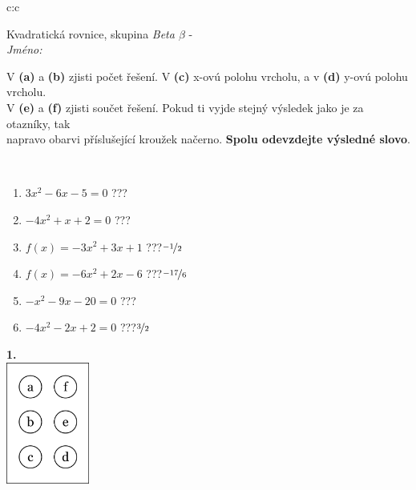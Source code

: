 \documentclass[10pt]{report}
\begin{document}
\begin{tabular}{c:c}
\begin{minipage}[c][104.5mm][t]{0.5\linewidth}
\begin{center}
\vspace{7mm}
{\huge Kvadratická rovnice, skupina \textit{Beta $\beta$} -}\\[5mm]
\textit{Jméno:}\phantom{xxxxxxxxxxxxxxxxxxxxxxxxxxxxxxxxxxxxxxxxxxxxxxxxxxxxxxxxxxxxxxxxx}\\[5mm]
\begin{minipage}{0.95\linewidth}
\begin{center}
V \textbf{(a)} a \textbf{(b)} zjisti počet řešení. V \textbf{(c)} x-ovú polohu vrcholu, a v \textbf{(d)} y-ovú polohu vrcholu.\\V \textbf{(e)} a \textbf{(f)} zjisti součet řešení. Pokud ti vyjde stejný výsledek jako je za otazníky, tak\\napravo obarvi příslušející kroužek načerno. \textbf{Spolu odevzdejte výsledné slovo}.
\end{center}
\end{minipage}
\\[1mm]
\begin{minipage}{0.79\linewidth}
\begin{center}
\begin{varwidth}{\linewidth}
\begin{enumerate}
\Large
\item $3x^2-6x-5=0$\quad \dotfill\; ???\;\dotfill {}
\item $-4x^2+x+2=0$\quad \dotfill\; ???\;\dotfill {}
\item $f(x)=-3x^2+3x+1$\quad \dotfill\; ???\;\dotfill \quad $\nicefrac{-1}{2}$
\item $f(x)=-6x^2+2x-6$\quad \dotfill\; ???\;\dotfill \quad $\nicefrac{-17}{6}$
\item $-x^2-9x-20=0$\quad \dotfill\; ???\;\dotfill {}
\item $-4x^2-2x+2=0$\quad \dotfill\; ???\;\dotfill \quad $\nicefrac{3}{2}$
\end{enumerate}
\end{varwidth}
\end{center}
\end{minipage}
\begin{minipage}{0.20\linewidth}
\begin{center}
{\Huge\bfseries 1.} \\[2mm]
\includegraphics[height=40mm]{../images/braille.png}

\end{center}
\end{minipage}
\end{center}
\end{minipage}
\end{tabular}
\end{document}
